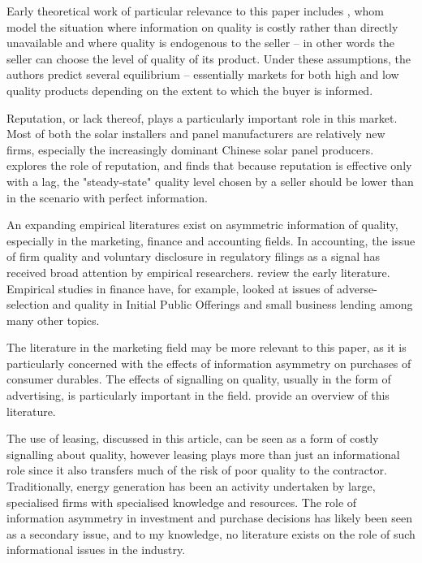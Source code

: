 \documentclass[12pt]{article}
\begin{document}
Early theoretical work of particular relevance to this paper includes \citet{chan_prices_1982}, whom model the situation where information on quality is costly rather than directly unavailable and where quality is endogenous to the seller -- in other words the seller can choose the level of quality of its product. Under these assumptions, the authors predict several equilibrium -- essentially markets for both high and low quality products depending on the extent to which the buyer is informed.

Reputation, or lack thereof, plays a particularly important role in this market. Most of both the solar installers and panel manufacturers are relatively new firms, especially the increasingly dominant Chinese solar panel producers. \citet{shapiro_consumer_1982} explores the role of reputation, and finds that because reputation is effective only with a lag, the "steady-state" quality level chosen by a seller should be lower than in the scenario with perfect information.

An expanding empirical literatures exist on asymmetric information of quality, especially in the marketing, finance and accounting fields. In accounting, the issue of firm quality and voluntary disclosure in regulatory filings as a signal has received broad attention by empirical researchers. \citet{healy_information_2001} review the early literature. Empirical studies in finance have, for example, looked at issues of adverse-selection and quality in Initial Public Offerings \citep{michaely_pricing_1994} and small business lending \citep{petersen_benefits_1994} among many other topics.

The literature in the marketing field may be more relevant to this paper, as it is particularly concerned with the effects of information asymmetry on purchases of consumer durables. The effects of signalling on quality, usually in the form of advertising, is particularly important in the field. \citet{kirmani_no_2000} provide an overview of this literature.

The use of leasing, discussed in this article, can be seen as a form of costly signalling about quality, however leasing plays more than just an informational role since it also transfers much of the risk of poor quality to the contractor. Traditionally, energy generation has been an activity undertaken by large, specialised firms with specialised knowledge and resources. The role of information asymmetry in investment and purchase decisions has likely been seen as a secondary issue, and to my knowledge, no literature exists on the role of such informational issues in the industry.
\end{document}
